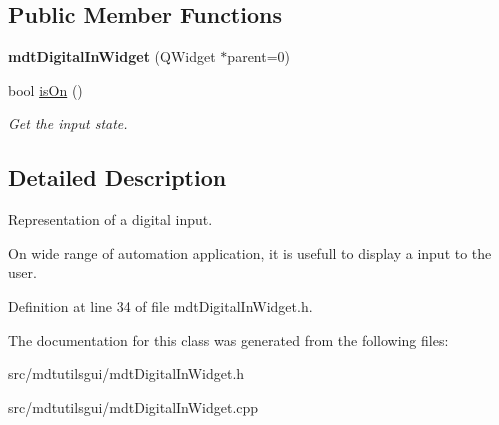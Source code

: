 \subsection*{Public Member Functions}
\begin{DoxyCompactItemize}
\item 
\hypertarget{classmdt_digital_in_widget_a749a19cba05810ad2d2fc249d8fe2827}{
{\bfseries mdtDigitalInWidget} (QWidget $\ast$parent=0)}
\label{classmdt_digital_in_widget_a749a19cba05810ad2d2fc249d8fe2827}

\item 
\hypertarget{classmdt_digital_in_widget_a238aefedbd1e9a1fd08c3976caa3c995}{
bool \hyperlink{classmdt_digital_in_widget_a238aefedbd1e9a1fd08c3976caa3c995}{isOn} ()}
\label{classmdt_digital_in_widget_a238aefedbd1e9a1fd08c3976caa3c995}

\begin{DoxyCompactList}\small\item\em Get the input state. \end{DoxyCompactList}\end{DoxyCompactItemize}


\subsection{Detailed Description}
Representation of a digital input. 

On wide range of automation application, it is usefull to display a input to the user. 

Definition at line 34 of file mdtDigitalInWidget.h.



The documentation for this class was generated from the following files:\begin{DoxyCompactItemize}
\item 
src/mdtutilsgui/mdtDigitalInWidget.h\item 
src/mdtutilsgui/mdtDigitalInWidget.cpp\end{DoxyCompactItemize}
